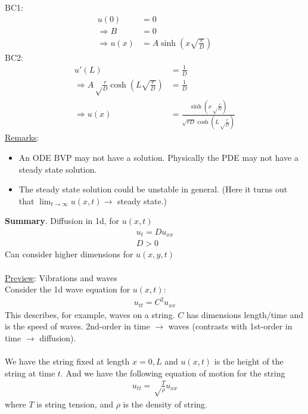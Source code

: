 \documentclass[12pt, letterpaper]{article}
\begin{document}
BC1: 
\begin{align*}
    u(0) &= 0 \\
    \Rightarrow B &= 0 \\
    \Rightarrow u(x) &= A\sinh\left(x\sqrt{\frac{r}{D}}\right)
\end{align*} 
BC2: 
\begin{align*}
    u'(L) &= \frac 1D \\
    \Rightarrow A \sqrt\frac{r}{D} \cosh \left(L \sqrt{\frac{r}{D}}\right) &= \frac 1D \\
    \Rightarrow u(x) &=  \frac{\sinh\left( x \sqrt \frac rD\right)}{\sqrt{rD} \cosh\left(L \sqrt \frac rD\right)}
\end{align*}
\underline{Remarks}:
\begin{itemize}
    \item An ODE BVP may not have a solution. Physically the PDE may not have a steady 
    state solution.
    \item The steady state solution could be unstable in general. (Here it turns out that 
    $\lim_{t\rightarrow \infty} u(x,t) \rightarrow $ steady state.)
\end{itemize}
\textbf{Summary}. Diffusion in 1d, for $u(x,t)$
\begin{align*}
    u_t = Du_{xx} \\
    D > 0
\end{align*}
Can consider higher dimensions for $u(x,y,t)$ \\ \\
\underline{Preview}: Vibrations and waves \\
Consider the 1d wave equation for $u(x,t)$:
\begin{align*}
    u_{tt} = C^2u_{xx}
\end{align*}
This describes, for example, waves on a string. $C$ has dimensions length/time and 
is the speed of waves. 2nd-order in time $\rightarrow$ waves (contrasts with 1st-order 
in time $\rightarrow$ diffusion). \\ \\
We have the string fixed at length $x = 0, L$ and $u(x,t)$ is the height of the string
at time $t$. And we have the following equation of motion for the string
\begin{align*}
    u_{tt} = \sqrt \frac{T}{\rho}u_{xx}
\end{align*}
where $T$ is string tension, and $\rho$ is the density of string.
\end{document}
